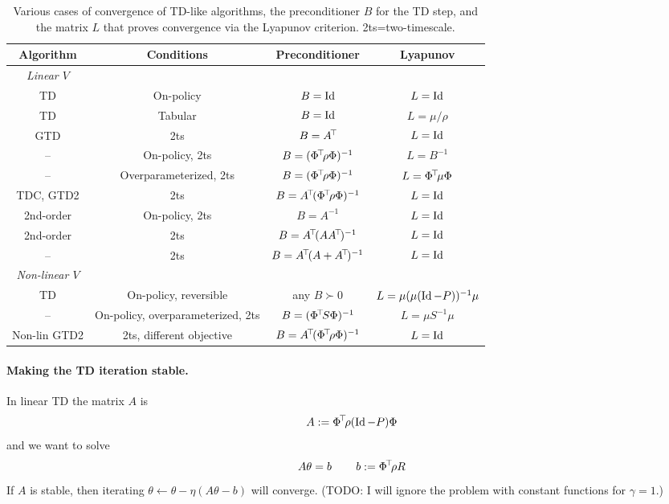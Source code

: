 \documentclass[11pt,a4paper]{article}
\begin{document}
\begin{table}
\begin{tabular}{cccc}
Algorithm & Conditions & Preconditioner & Lyapunov
\\
\hline
\emph{Linear $V$} \\
TD	& On-policy & $B=\operatorname{Id}$ & $L=\operatorname{Id}$ \\
TD & Tabular & $B=\operatorname{Id}$ & $L=\mu/\rho$ \\
GTD & 2ts & $B=A^{\!\top}\!$ & $L=\operatorname{Id}$\\
– & On-policy, 2ts & $B=(\Phi^{\!\top}\!\rho\Phi)^{-1}$ & $L=B^{-1}$ \\
– & Overparameterized, 2ts & $B=(\Phi^{\!\top}\!\rho\Phi)^{-1}$ &
$L=\Phi^{\!\top}\!\mu\Phi$ \\
TDC, GTD2 & 2ts & $B=A^{\!\top}\!(\Phi^{\!\top}\!\rho\Phi)^{-1}$ &
$L=\operatorname{Id}$ \\
2nd-order & On-policy, 2ts & $B=A^{-1}$ & $L=\operatorname{Id}$\\
2nd-order & 2ts & $B=A^{\!\top}\!(AA^{\!\top}\!)^{-1}$ & $L=\operatorname{Id}$\\
– & 2ts & $B=A^{\!\top}\!(A+A^{\!\top}\!)^{-1}$ & $L=\operatorname{Id}$\\
\hline
\emph{Non-linear $V$} \\
TD & On-policy, reversible & any $B\succ 0$ & $L=\mu(\mu(\operatorname{Id}-P))^{-1}\mu$
\\
– & On-policy, overparameterized, 2ts & $B=(\Phi^{\!\top}\!S\Phi)^{-1}$ &
$L= \mu S^{-1} \mu$ \\
Non-lin GTD2 & 2ts, different objective &
$B=A^{\!\top}\!(\Phi^{\!\top}\!\rho\Phi)^{-1}$  & $L=\operatorname{Id}$
\\\hline
\end{tabular}
\label{tab:TDlist}
\caption{Various cases of convergence of TD-like algorithms, the
preconditioner $B$ for the TD step, and the matrix $L$ that proves
convergence via the Lyapunov criterion. 2ts=two-timescale.}
\end{table}

\paragraph{Making the TD iteration stable.} In linear TD the matrix $A$ is
\begin{equation}
A\mathrel{\mathop{:}}= \Phi^{\!\top}\!\rho (\operatorname{Id}-P)\Phi
\end{equation}
and we want to solve
\begin{equation}
A\theta=b\,\qquad b\mathrel{\mathop{:}}= \Phi^{\!\top}\!\rho R
\end{equation}
If $A$ is stable, then iterating $\theta\gets \theta -\eta(A\theta-b)$ will
converge. (TODO: I will ignore the problem with constant functions for
$\gamma=1$.)
\end{document}

